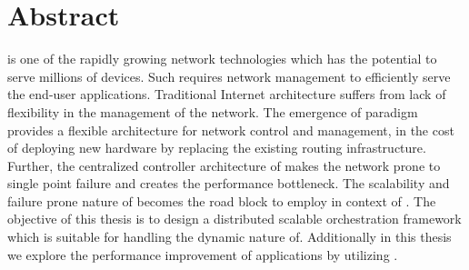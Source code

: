 \chapter*{\centering Abstract}
\thispagestyle{cleanPage}
 is one of the rapidly growing network technologies which has the potential to serve millions of devices. Such  requires network management to efficiently serve the end-user applications. Traditional Internet architecture suffers from lack of flexibility in the management of the network. The emergence of  paradigm provides a flexible architecture for network control and management, in the cost of deploying new hardware by replacing the existing routing infrastructure. Further, the centralized controller architecture of  makes the network prone to single point failure and creates the performance bottleneck. The scalability and failure prone nature of  becomes the road block to employ  in context of . The objective of this thesis is to design a distributed scalable  orchestration framework which is suitable for handling the dynamic nature of. Additionally in this thesis we explore the performance improvement of  applications by utilizing . 


